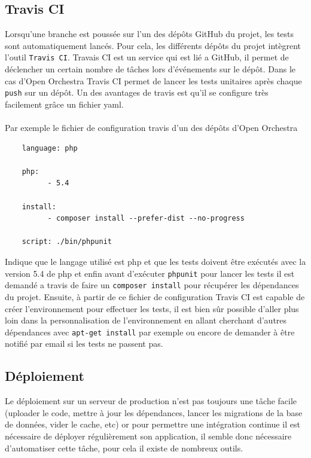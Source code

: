 \subsection{Travis CI}
Lorsqu'une branche est poussée sur l'un des dépôts GitHub du projet, les tests sont automatiquement lancés. Pour cela, les différents dépôts du projet intègrent l'outil \verb?Travis CI?. Travais CI est un service qui est lié a GitHub, il permet de déclencher un certain nombre de tâches lors d'événements sur le dépôt. Dans le cas d'Open Orchestra Travis CI permet de lancer les tests unitaires après chaque \verb?push? sur un dépôt. Un des avantages de travis est qu'il se configure très facilement grâce un fichier yaml.
\paragraph{}
Par exemple le fichier de configuration travis d'un des dépôts d'Open Orchestra 
\begin{verbatim}
    language: php

    php:
          - 5.4

    install:
          - composer install --prefer-dist --no-progress
 
    script: ./bin/phpunit
\end{verbatim}

Indique que le langage utilisé est php et que les tests doivent être exécutés avec la version 5.4 de php et enfin avant d'exécuter \verb?phpunit? pour lancer les tests il est demandé a travis de faire un \verb?composer install? pour récupérer les dépendances du projet. Ensuite, à partir de ce fichier de configuration Travis CI est capable de créer l'environnement pour effectuer les tests, il est bien sûr possible d'aller plus loin dans la personnalisation de l'environnement en allant cherchant d'autres dépendances avec \verb?apt-get install? par exemple ou encore de demander à être notifié par email si les tests ne passent pas.

\subsection{Déploiement}
Le déploiement sur un serveur de production n'est pas toujours une tâche facile (uploader le code, mettre à jour les dépendances, lancer les migrations de la base de données, vider le cache, etc)  or pour permettre une intégration continue il est nécessaire de déployer régulièrement son application, il semble donc nécessaire d'automatiser cette tâche, pour cela il existe de nombreux outils. 
